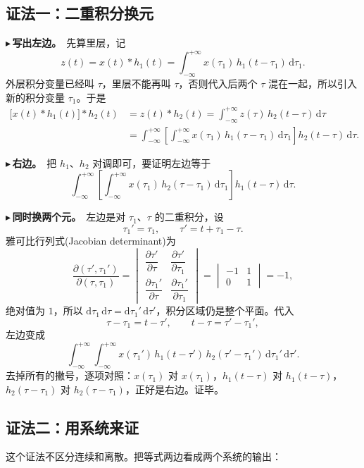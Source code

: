 \documentclass[UTF8,a4paper,11pt]{ctexart}
\newcounter{ex}[section]
\newcommand{\point}[1]{\par\addvspace{1ex}\noindent\textcolor{ptteal}{$\blacktriangleright$\,\textbf{#1}}\ }
\begin{document}
\subsection{证法一：二重积分换元}
\point{写出左边。}先算里层，记
\[
z(t)=x(t)\ast h_1(t)=\int_{-\infty}^{+\infty}x(\tau_1)\,h_1(t-\tau_1)\,\mathrm{d}\tau_1 .
\]
外层积分变量已经叫 $\tau$，里层不能再叫 $\tau$，否则代入后两个 $\tau$ 混在一起，所以引入新的积分变量 $\tau_1$。于是
\begin{align*}
\big[x(t)\ast h_1(t)\big]\ast h_2(t)&=z(t)\ast h_2(t)=\int_{-\infty}^{+\infty}z(\tau)\,h_2(t-\tau)\,\mathrm{d}\tau\\
&=\int_{-\infty}^{+\infty}\left[\int_{-\infty}^{+\infty}x(\tau_1)\,h_1(\tau-\tau_1)\,\mathrm{d}\tau_1\right]h_2(t-\tau)\,\mathrm{d}\tau .
\end{align*}
\point{右边。}把 $h_1$、$h_2$ 对调即可，要证明左边等于
\[
\int_{-\infty}^{+\infty}\left[\int_{-\infty}^{+\infty}x(\tau_1)\,h_2(\tau-\tau_1)\,\mathrm{d}\tau_1\right]h_1(t-\tau)\,\mathrm{d}\tau .
\]
\point{同时换两个元。}左边是对 $\tau_1$、$\tau$ 的二重积分，设
\[
\tau_1'=\tau_1,\qquad \tau'=t+\tau_1-\tau .
\]
雅可比行列式(Jacobian determinant)为
\[
\frac{\partial(\tau',\tau_1')}{\partial(\tau,\tau_1)}=
\begin{vmatrix}\dfrac{\partial\tau'}{\partial\tau}&\dfrac{\partial\tau'}{\partial\tau_1}\\[2ex]\dfrac{\partial\tau_1'}{\partial\tau}&\dfrac{\partial\tau_1'}{\partial\tau_1}\end{vmatrix}
=\begin{vmatrix}-1&1\\0&1\end{vmatrix}=-1,
\]
绝对值为 $1$，所以 $\mathrm{d}\tau_1\,\mathrm{d}\tau=\mathrm{d}\tau_1'\,\mathrm{d}\tau'$，积分区域仍是整个平面。代入
\[
\tau-\tau_1=t-\tau',\qquad t-\tau=\tau'-\tau_1',
\]
左边变成
\[
\int_{-\infty}^{+\infty}\!\!\int_{-\infty}^{+\infty}x(\tau_1')\,h_1(t-\tau')\,h_2(\tau'-\tau_1')\,\mathrm{d}\tau_1'\,\mathrm{d}\tau' .
\]
去掉所有的撇号，逐项对照：$x(\tau_1)$ 对 $x(\tau_1)$，$h_1(t-\tau)$ 对 $h_1(t-\tau)$，$h_2(\tau-\tau_1)$ 对 $h_2(\tau-\tau_1)$，正好是右边。证毕。

\subsection{证法二：用系统来证}
这个证法不区分连续和离散。把等式两边看成两个系统的输出：
\end{document}
